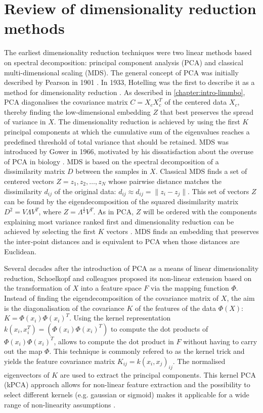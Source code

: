 \section{Review of dimensionality reduction methods}
\label{section:Dimensionality-reduction-methods}
The earliest dimensionality reduction techniques were two linear methods based on spectral decomposition: principal component analysis (PCA) and classical multi-dimensional scaling (MDS). The general concept of PCA was initially described by Pearson in 1901 \citep{Pearson1901}. In 1933, Hotelling was the first to describe it as a method for dimensionality reduction \citep{Hoteling1933}. As described in \cref{chapter:intro-limmbo}, PCA diagonalises the covariance matrix \(C=X_cX_c^T\) of the centered data \(X_c\), thereby finding the low‐dimensional embedding \(Z\) that best preserves the spread of variance in \(X\). The dimensionality reduction is achieved by using the first \(K\) principal components at which the cumulative sum of the eigenvalues reaches a predefined threshold of total variance that should be retained. 
MDS was introduced by Gower in 1966, motivated by his dissatisfaction about the overuse of PCA in biology  \citeyear{Gower1966}. MDS is based on the spectral decomposition of a dissimilarity matrix \(D\) between the samples in \(X\). Classical MDS finds a set of centered vectors \(Z={z_1, z_2, \dots , z_N}\) whose pairwise distance matches the dissimilarity \(d_{ij}\) of the original data: \(d_{ij} \approx \hat{d_{ij}} = \lVert z_i - z_j\rVert \). This set of vectors \(Z\) can be found by the eigendecomposition of the squared dissimilarity matrix \(D^2 = V\Lambda V^T\), where \(Z=\Lambda^\frac{1}{2}V^T\). As in PCA, \(Z\) will be ordered with the components explaining most variance ranked first and dimensionality reduction can be achieved by selecting the first \(K\) vectors \citep{Gower1966}. MDS finds an embedding that preserves the inter‐point distances and is equivalent to PCA when those distances are Euclidean.

Several decades after the introduction of PCA as a means of linear dimensionality reduction, Schoelkopf and colleagues proposed its non-linear extension based on the transformation of \(X\) into a feature space \(F\) via the mapping function  \(\Phi\). Instead of finding the eigendecomposition of the covariance matrix of \(X\), the aim is the diagonalisation of the covariance \(K\) of the features of the data \(\Phi(X)\): \(K= \Phi(x_i)\Phi(x_i)^T\). Using the kernel representation \(k(x_i, x_i^T) = (\Phi(x_i)\Phi(x_i)^T)\) to compute the dot products of \(\Phi(x_i)\Phi(x_i)^T\), allows to compute the dot product in \(F\) without having to carry out the map \(\Phi\). This technique is commonly refered to as the kernel trick and yields the feature covariance matrix \(K_{ij} = k(x_i, x_j)_{ij}\). The normalised eigenvectors of \(K\) are used to extract the principal components. This kernel PCA (kPCA) approach allows for non-linear feature extraction and the possibility to select different kernels (e.g. gaussian or sigmoid) makes it applicable for a wide range of non-linearity assumptions \citep{Schoelkopf1998}.

